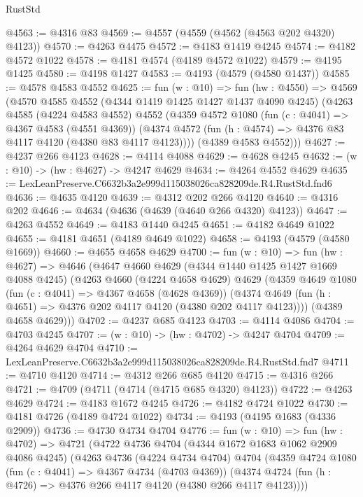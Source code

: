 \begin{lexlean}{RustStd}
\begin{coremodule}
@4563 := @4316 @83
@4569 := @4557 (@4559 (@4562 (@4563 @202 @4320) @4123))
@4570 := @4263 @4475
@4572 := @4183 @1419 @4245
@4574 := @4182 @4572 @1022
@4578 := @4181 @4574 (@4189 @4572 @1022)
@4579 := @4195 @1425
@4580 := @4198 @1427
@4583 := @4193 (@4579 (@4580 @1437))
@4585 := @4578 @4583 @4552
@4625 := fun (w : @10) =>
  fun (hw : @4550) =>
  @4569
    (@4570
      @4585
      @4552
      (@4344 @1419 @1425 @1427 @1437 @4090 @4245)
      (@4263
        @4585
        (@4224 @4583 @4552)
        @4552
        (@4359
          @4572
          @1080
          (fun (c : @4041) => @4367 @4583 (@4551 @4369))
          (@4374 @4572 (fun (h : @4574) => @4376 @83 @4117 @4120 (@4380 @83 @4117 @4123))))
        (@4389 @4583 @4552)))
@4627 := @4237 @266 @4123
@4628 := @4114 @4088
@4629 := @4628 @4245
@4632 := (w : @10) -> (hw : @4627) -> @4247 @4629
@4634 := @4264 @4552 @4629
@4635 := LexLeanPreserve.C6632b3a2e999d115038026ca828209de.R4.RustStd.fnd6
@4636 := @4635 @4120
@4639 := @4312 @202 @266 @4120
@4640 := @4316 @202
@4646 := @4634 (@4636 (@4639 (@4640 @266 @4320) @4123))
@4647 := @4263 @4552
@4649 := @4183 @1440 @4245
@4651 := @4182 @4649 @1022
@4655 := @4181 @4651 (@4189 @4649 @1022)
@4658 := @4193 (@4579 (@4580 @1669))
@4660 := @4655 @4658 @4629
@4700 := fun (w : @10) =>
  fun (hw : @4627) =>
  @4646
    (@4647
      @4660
      @4629
      (@4344 @1440 @1425 @1427 @1669 @4088 @4245)
      (@4263
        @4660
        (@4224 @4658 @4629)
        @4629
        (@4359
          @4649
          @1080
          (fun (c : @4041) => @4367 @4658 (@4628 @4369))
          (@4374 @4649 (fun (h : @4651) => @4376 @202 @4117 @4120 (@4380 @202 @4117 @4123))))
        (@4389 @4658 @4629)))
@4702 := @4237 @685 @4123
@4703 := @4114 @4086
@4704 := @4703 @4245
@4707 := (w : @10) -> (hw : @4702) -> @4247 @4704
@4709 := @4264 @4629 @4704
@4710 := LexLeanPreserve.C6632b3a2e999d115038026ca828209de.R4.RustStd.fnd7
@4711 := @4710 @4120
@4714 := @4312 @266 @685 @4120
@4715 := @4316 @266
@4721 := @4709 (@4711 (@4714 (@4715 @685 @4320) @4123))
@4722 := @4263 @4629
@4724 := @4183 @1672 @4245
@4726 := @4182 @4724 @1022
@4730 := @4181 @4726 (@4189 @4724 @1022)
@4734 := @4193 (@4195 @1683 (@4336 @2909))
@4736 := @4730 @4734 @4704
@4776 := fun (w : @10) =>
  fun (hw : @4702) =>
  @4721
    (@4722
      @4736
      @4704
      (@4344 @1672 @1683 @1062 @2909 @4086 @4245)
      (@4263
        @4736
        (@4224 @4734 @4704)
        @4704
        (@4359
          @4724
          @1080
          (fun (c : @4041) => @4367 @4734 (@4703 @4369))
          (@4374 @4724 (fun (h : @4726) => @4376 @266 @4117 @4120 (@4380 @266 @4117 @4123))))

\end{coremodule}
\end{lexlean}
